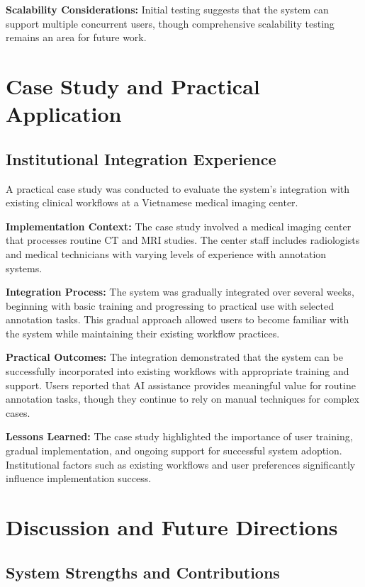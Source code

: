 \textbf{Scalability Considerations:} Initial testing suggests that the system can support multiple concurrent users, though comprehensive scalability testing remains an area for future work.

\section{Case Study and Practical Application}

\subsection{Institutional Integration Experience}

A practical case study was conducted to evaluate the system's integration with existing clinical workflows at a Vietnamese medical imaging center.

\textbf{Implementation Context:} The case study involved a medical imaging center that processes routine CT and MRI studies. The center staff includes radiologists and medical technicians with varying levels of experience with annotation systems.

\textbf{Integration Process:} The system was gradually integrated over several weeks, beginning with basic training and progressing to practical use with selected annotation tasks. This gradual approach allowed users to become familiar with the system while maintaining their existing workflow practices.

\textbf{Practical Outcomes:} The integration demonstrated that the system can be successfully incorporated into existing workflows with appropriate training and support. Users reported that AI assistance provides meaningful value for routine annotation tasks, though they continue to rely on manual techniques for complex cases.

\textbf{Lessons Learned:} The case study highlighted the importance of user training, gradual implementation, and ongoing support for successful system adoption. Institutional factors such as existing workflows and user preferences significantly influence implementation success.

\section{Discussion and Future Directions}

\subsection{System Strengths and Contributions}

